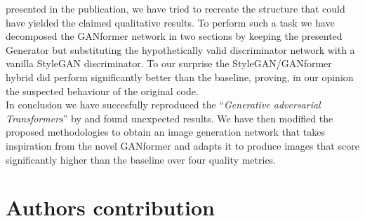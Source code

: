 \documentclass{article}
\begin{document}
	presented 
	in the publication, we have tried to recreate the structure that could have yielded the claimed 
	qualitative results.
	To perform such a task we have decomposed the GANformer network in two sections by keeping 
	the presented 
	Generator but substituting the hypothetically valid discriminator network with a vanilla StyleGAN 
	discriminator.
	To our surprise the StyleGAN/GANformer hybrid did perform significantly better than the baseline, 
	proving, 
	in our opinion the suspected behaviour of the original code.
	\\
	In conclusion we have succesfully reproduced the ``\emph{Generative adversarial Transformers}'' by 
	\citet{hudson2021generative} 
	and found unexpected results.
	We have then modified the proposed methodologies to obtain an image generation network that 
	takes inspiration from the 
	novel GANformer and adapts it to produce images that score significantly higher than the baseline 
	over four quality metrics.
	\section{Authors contribution}
	
	
	
\end{document}

